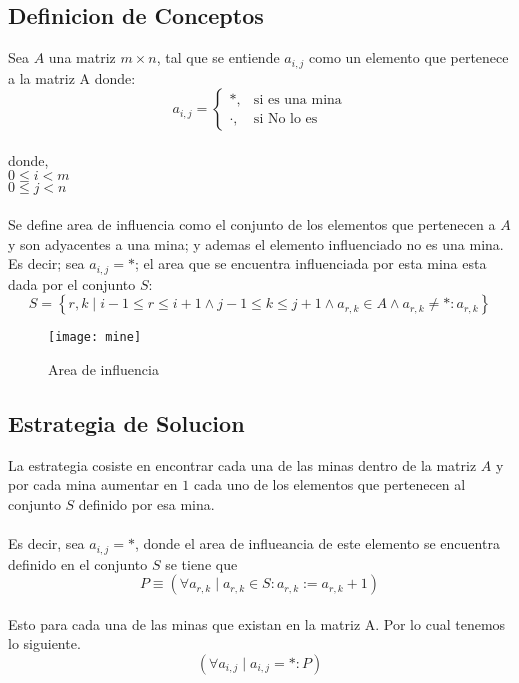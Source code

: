 \documentclass[12pt]{article}
\begin{document}
\subsection{Definicion de Conceptos}
Sea $A$ una matriz ${m}\times{n}$, tal que se entiende $a_{i,j}$ como un elemento que pertenece a la matriz A donde:
\[a_{i,j}=\left\{\begin{array}{cl}
\ast,&\mbox{si es una mina}\\
\cdot,&\mbox{si No lo es}\end{array}\right.\]\\
donde, \\$0\leq i < m$ \\$0\leq j < n$ 
\paragraph{}
Se define area de influencia como el conjunto de los elementos que pertenecen a $A$ y son adyacentes a una mina; y ademas el elemento influenciado no es una mina. Es decir; sea $a_{i,j}=\ast$; el area que se encuentra influenciada por esta mina esta dada por el conjunto $S$:\\
\[
S=\left\{r,k\mid i-1\leq r \leq i+1 \wedge j-1\leq k \leq j+1 \wedge a_{r,k} \in A \wedge a_{r,k} \neq \ast: a_{r,k}\right\}
\]
\begin{figure} [h]
\begin {center}
\texttt{[image: mine]}
\caption{Area de influencia}
\end {center}
\end{figure}
\subsection{Estrategia de Solucion}
La estrategia cosiste en encontrar cada una de las minas dentro de la matriz $A$ y por cada mina aumentar en $1$ cada uno de los elementos que pertenecen al conjunto $S$ definido por esa mina.
\paragraph{}
Es decir, sea $a_{i,j}=\ast$, donde el area de influeancia de este elemento se encuentra definido en el conjunto $S$ se tiene que
\[
P\equiv(\forall a_{r,k}\mid a_{r,k} \in S : a_{r,k}:= a_{r,k} + 1)
\]
\paragraph{}
Esto para cada una de las minas que existan en la matriz A. Por lo cual tenemos lo siguiente.
\[
(\forall a_{i,j}\mid a_{i,j}=\ast : P )
\]
\end{document}
